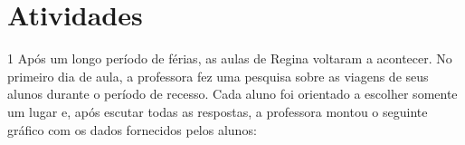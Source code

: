 
\section*{Atividades}

\num{1} Após um longo período de férias, as aulas de Regina voltaram a acontecer.
No primeiro dia de aula, a professora fez uma pesquisa sobre as viagens de seus alunos durante o período de recesso. Cada aluno foi
orientado a escolher somente um lugar e, após escutar todas as respostas,
a professora montou o seguinte gráfico com os dados fornecidos pelos alunos:


